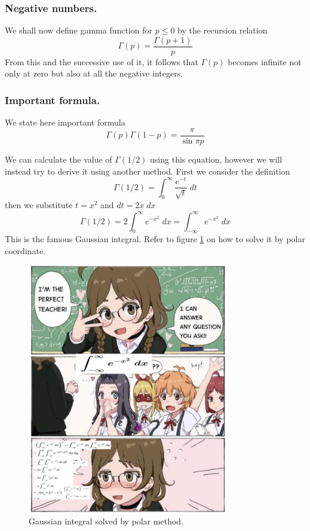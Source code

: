 \documentclass[../main.tex]{subfiles}
\begin{document}
\subsubsection*{Negative numbers.} We shall now deﬁne gamma function for $p\leq 0$ by the recursion 
relation 
\begin{equation*}
    \Gamma(p)=\frac{\Gamma(p+1)}{p}
\end{equation*}
From this and the successive use of it, it follows that $\Gamma(p)$ becomes infinite not only at zero but also at all the negative integers.

\subsubsection*{Important formula.} We state here important formula
\begin{equation*}
    \Gamma(p)\Gamma(1-p)=\frac{\pi}{\sin \pi p}
\end{equation*}

We can calculate the value of $\Gamma(1/2)$ using this equation, however we will instead try to derive it using another method. First we consider the definition
\begin{equation*}
    \Gamma(1/2)=\int_{0}^{\infty}\frac{e^{-t}}{\sqrt{t}}\;dt
\end{equation*}
then we substitute $t=x^2$ and $dt=2x\;dx$
\begin{equation*}
    \Gamma(1/2)=2\int_{0}^{\infty}e^{-x^2}\;dx=\int_{-\infty}^{\infty}e^{-x^2}\;dx
\end{equation*}
This is the famous Gaussian integral. Refer to figure \ref{fig} on how to solve it by polar coordinate. 

\begin{figure}
    \centering
    \includegraphics[width=0.78\textwidth]{../../Rss/SFunc/9az27w9ge34e1.jpg}
    \caption{Gaussian integral solved by polar method.}
    \label{fig}
\end{figure}
\end{document}
